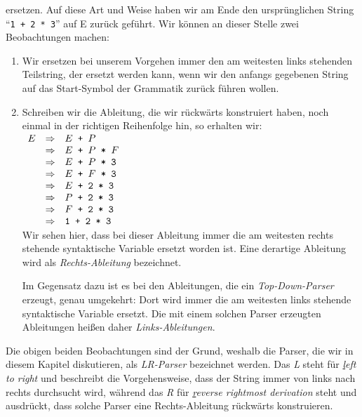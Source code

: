 ersetzen.  Auf diese Art und Weise haben wir am Ende den urspr\"unglichen String 
``\texttt{1 + 2 * 3}'' auf E zur\"uck gef\"uhrt.  Wir k\"onnen an dieser Stelle zwei
Beobachtungen machen:
\begin{enumerate}
\item Wir ersetzen bei unserem Vorgehen immer den am weitesten links stehenden Teilstring,
      der ersetzt werden kann, wenn wir den anfangs gegebenen String auf das Start-Symbol
      der Grammatik zur\"uck f\"uhren wollen.
\item Schreiben wir die Ableitung, die wir r\"uckw\"arts konstruiert haben, noch einmal
      in der richtigen Reihenfolge hin, so erhalten wir:
\\[0.2cm]
\hspace*{1.3cm}
$
\begin{array}[t]{lcl}
E  & \Rightarrow & E \texttt{ + } P \\
   & \Rightarrow & E \texttt{ + } P \texttt{ * } F \\
   & \Rightarrow & E \texttt{ + } P \texttt{ * 3} \\
   & \Rightarrow & E \texttt{ + } F \texttt{ * 3} \\
   & \Rightarrow & E \texttt{ + 2 * 3} \\
   & \Rightarrow & P \texttt{ + 2 * 3} \\
   & \Rightarrow & F \texttt{ + 2 * 3} \\
   & \Rightarrow & \texttt{1 + 2 * 3}
\end{array}
$
\\[0.2cm]
       Wir sehen hier, dass bei dieser Ableitung immer die am weitesten rechts stehende
       syntaktische Variable ersetzt worden ist.  Eine derartige Ableitung wird als
       \emph{Rechts-Ableitung} bezeichnet.   

       Im Gegensatz dazu ist es bei den Ableitungen, die ein \emph{Top-Down-Parser}
       erzeugt, genau umgekehrt:  Dort wird immer die am weitesten links stehende
       syntaktische Variable ersetzt.  Die mit einem solchen Parser erzeugten Ableitungen
       hei{\ss}en daher \emph{Links-Ableitungen}.
\end{enumerate}
Die obigen beiden Beobachtungen sind der Grund, weshalb die Parser, die wir in diesem
Kapitel diskutieren, als \emph{LR-Parser} bezeichnet werden.  Das \emph{L} steht f\"ur
\emph{\underline{l}eft to right} und beschreibt die Vorgehensweise, dass der String immer
von links nach rechts durchsucht wird, w\"ahrend das \emph{R} f\"ur 
\emph{\underline{r}everse rightmost derivation} steht
und ausdr\"uckt, dass solche Parser eine Rechts-Ableitung r\"uckw\"arts konstruieren.
\vspace*{0.2cm}

